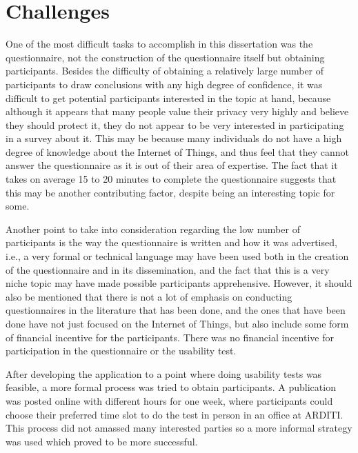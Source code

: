 %
%
\section{Challenges}\label{section:challenges}

One of the most difficult tasks to accomplish in this dissertation was the
questionnaire, not the construction of the questionnaire itself but
obtaining participants. Besides the difficulty of obtaining a relatively
large number of participants to draw conclusions with any high degree of
confidence, it was difficult to get potential participants interested in the topic
at hand, because although it appears that many people value their privacy very
highly and believe they should protect it, they do not appear to be very
interested in participating in a survey about it.
This may be because many individuals do not have a high degree of knowledge
about the Internet of Things, and thus feel that they cannot answer the
questionnaire as it is out of their area of expertise. The fact that
it takes on average 15 to 20 minutes to complete the questionnaire suggests
that this may be another contributing factor, despite being an interesting
topic for some.

Another point to take into consideration regarding the low
number of participants is the way the questionnaire is written and how
it was advertised, i.e., a very formal or technical language may have
been used both in the creation of the questionnaire and in its
dissemination, and the fact that this is a very niche topic may have
made possible participants apprehensive. However, it should also be mentioned
that there is not a lot of emphasis on conducting questionnaires in the
literature that has been done, and the ones that have been done have not
just focused on the Internet of Things, but also include some form of financial
incentive for the participants. There was no financial incentive for
participation in the questionnaire or the usability test.

After developing the application to a point where doing usability tests was
feasible, a more formal process was tried to obtain participants. A
publication was posted online with different hours for one week, where
participants could choose their preferred time slot to do the test
in person in an office at ARDITI. This process did not amassed many
interested parties so a more informal strategy was used which proved
to be more successful.


